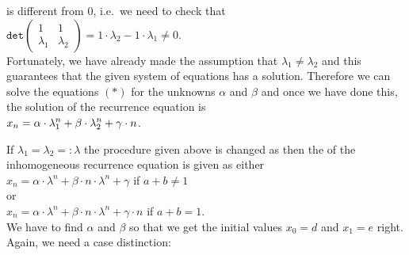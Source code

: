 \begin{enumerate}
\begin{enumerate}
            is different from $0$, i.e.~we need to check that
            \\[0.2cm]
            \hspace*{1.3cm}
            $\texttt{det}\left(
              \begin{array}{cc}
                1         & 1        \\
                \lambda_1 & \lambda_2  
              \end{array}
               \right) = 1 \cdot \lambda_2 - 1 \cdot \lambda_1
            \not= 0$.
            \\[0.2cm]
            Fortunately, we have already made the assumption that $\lambda_1 \not= \lambda_2$ and this
            guarantees that the given system of equations has a solution.
            Therefore we can solve the equations $(*)$ for the unknowns $\alpha$ and $\beta$ and once we have
            done this, the solution of the recurrence equation is
            \\[0.2cm]
            \hspace*{1.3cm}
            $\displaystyle x_{n} = \alpha \cdot \lambda_1^n + \beta \cdot \lambda_2^n + \gamma \cdot n$.
      \end{enumerate}
\end{enumerate}
If $\lambda_1 = \lambda_2 =: \lambda$  the procedure given above is changed as then the  of
the inhomogeneous recurrence equation is given as either
\\[0.2cm]
\hspace*{1.3cm}
$x_n = \alpha \cdot \lambda^n + \beta \cdot n \cdot \lambda^n + \gamma$ \quad if $a + b \not= 1$
\\[0.2cm]
or
\\[0.2cm]
\hspace*{1.3cm}
$x_n = \alpha \cdot \lambda^n + \beta \cdot n \cdot \lambda^n + \gamma \cdot n$ \quad if $a + b = 1$.
\\[0.2cm]
We have to find $\alpha$ and $\beta$ so that we get the initial values $x_0 = d$ and $x_1 = e$ right.
Again, we need a case distinction:
